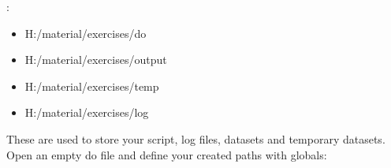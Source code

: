 \documentclass[letterpaper,10pt,openany,onesideH,english]{sphinxmanual}
\begin{document}
:


\begin{figure}[H]
\centering

\noindent{}
\end{figure}

\begin{itemize}
\item {} 
H:/material/exercises/do

\item {} 
H:/material/exercises/output

\item {} 
H:/material/exercises/temp

\item {} 
H:/material/exercises/log

\end{itemize}

These are used to store your script, log files, datasets and temporary datasets. Open an empty do file and define your created paths with globals:
\end{document}

